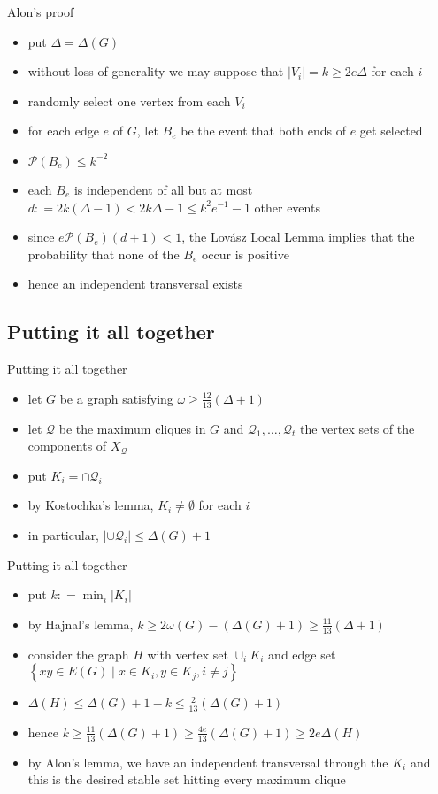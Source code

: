 \documentclass{beamer}
\theoremstyle{plain}
\newtheorem{lem}[thm]{Lemma}
\theoremstyle{definition}
\theoremstyle{remark}
\newcommand{\fancy}[1]{\mathcal{#1}}
\newcommand{\setbs}[2]{\left\{ #1 \mid #2 \right\}}
\newcommand{\card}[1]{\left|#1\right|}
\newcommand{\DefinedAs}{\mathrel{\mathop:}=}
\newcommand{\1}{\item<1-> }
\newcommand{\2}{\item<2-> }
\newcommand{\3}{\item<3-> }
\newcommand{\4}{\item<4-> }
\newcommand{\5}{\item<5-> }
\newcommand{\6}{\item<6-> }
\newcommand{\7}{\item<7-> }
\newcommand{\8}{\item<8-> }
\newcommand{\9}{\item<9-> }
\begin{document}
\begin{frame}{Alon's proof}
\begin{itemize}
\1 put $\Delta = \Delta(G)$
\2 without loss of generality we may suppose that $\card{V_i} = k \geq 2e\Delta$ for each $i$
\3 randomly select one vertex from each $V_i$
\4 for each edge $e$ of $G$, let $B_e$ be the event that both ends of $e$ get selected
\5 $\fancy{P}(B_e) \leq k^{-2}$
\6 each $B_e$ is independent of all but at most $d \DefinedAs 2k(\Delta - 1) < 2k\Delta - 1 \leq k^2e^{-1} - 1$ other events
\7 since $e\fancy{P}(B_e)(d + 1) < 1$, the Lov{\'a}sz Local Lemma implies that the probability that none of the $B_e$ occur is positive
\8 hence an independent transversal exists
\end{itemize}
\end{frame}

\subsection{Putting it all together}
\begin{frame}{Putting it all together}

\begin{itemize}
\2 let $G$ be a graph satisfying $\omega \geq \frac{12}{13}(\Delta + 1)$
\3 let $\fancy{Q}$ be the maximum cliques in $G$ and $\fancy{Q}_1, \ldots, \fancy{Q}_t$ the vertex sets of the components of $X_{\fancy{Q}}$
\4 put $K_i = \cap \fancy{Q}_i$
\5 by Kostochka's lemma, $K_i \neq \emptyset$ for each $i$
\6 in particular, $\card{\cup \fancy{Q}_i} \leq \Delta(G) + 1$
\end{itemize}
\end{frame}

\begin{frame}{Putting it all together}
\begin{itemize}
\1 put $k \DefinedAs \min_i \card{K_i}$
\2 by Hajnal's lemma, $k \geq 2\omega(G) - (\Delta(G) + 1) \geq \frac{11}{13}(\Delta + 1)$
\3 consider the graph $H$ with vertex set $\cup_i K_i$ and edge set $\setbs{xy \in E(G)}{x \in K_i, y \in K_j, i \neq j}$
\4 $\Delta(H) \leq \Delta(G) + 1 - k \leq \frac{2}{13}(\Delta(G) + 1)$
\5 hence $k \geq \frac{11}{13}(\Delta(G) + 1) \geq \frac{4e}{13}(\Delta(G) + 1) \geq 2e\Delta(H)$
\6 by Alon's lemma, we have an independent transversal through the $K_i$ and this is the desired stable set hitting every maximum clique
\end{itemize}
\end{frame}
\end{document}
